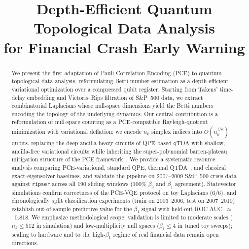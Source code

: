 \documentclass[conference,10pt]{IEEEtran}
\begin{document}
\title{Depth-Efficient Quantum Topological Data Analysis\\for Financial Crash Early Warning}

\author{
\and
{}
}

\maketitle

\begin{abstract}
We present the first adaptation of Pauli Correlation Encoding (PCE)
to quantum topological data analysis, reformulating Betti number
estimation as a depth-efficient variational optimization over a
compressed qubit register. Starting from Takens' time-delay embedding
and Vietoris--Rips filtration of S\&P~500 data, we extract
combinatorial Laplacians whose null-space dimensions yield the Betti
numbers encoding the topology of the underlying dynamics. Our central
contribution is a reformulation of null-space counting as a
PCE-compatible Rayleigh-quotient minimization with variational
deflation: we encode $n_k$ simplex indices into $O(n_k^{1/\kappa})$
qubits, replacing the deep ancilla-heavy circuits of QPE-based qTDA
with shallow, ancilla-free variational circuits while inheriting the
super-polynomial barren-plateau mitigation structure of the PCE
framework~\cite{Sciorilli24}. We provide a systematic resource
analysis comparing PCE-variational, standard QPE, thermal
QTDA~\cite{Scali24}, and classical exact-eigensolver baselines, and
validate the pipeline on 2007--2009 S\&P~500 crisis data against
\texttt{ripser} across all 190 sliding windows (100\% $\beta_0$ and
$\beta_1$ agreement). Statevector simulations confirm correctness of
the PCE-VQE protocol on toy Laplacians (6/6), and chronologically
split classification experiments (train on 2003--2006, test on
2007--2010) establish out-of-sample predictive value for the
$\beta_1$ signal with held-out ROC AUC~$\approx$~0.818. We emphasize
methodological scope: validation is limited to moderate scales
($n_k \leq 512$ in simulation) and low-multiplicity null spaces
($\beta_1 \leq 4$ in tuned toy sweeps); scaling to hardware and
to the high-$\beta_1$ regime of real financial data remain open
directions.
\end{abstract}
\end{document}
